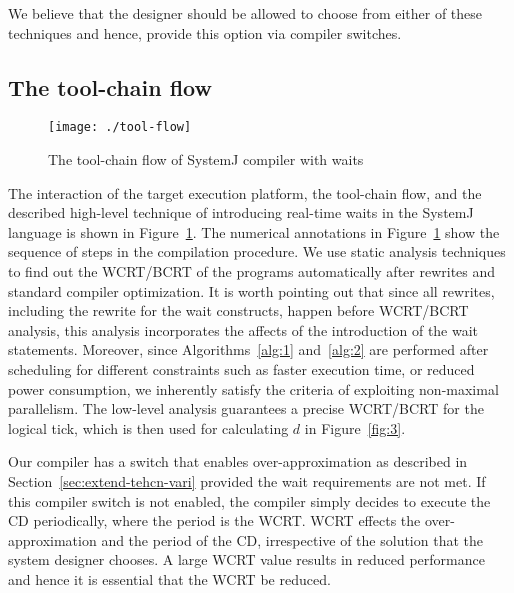 We believe that the designer should be allowed to choose from either of
these techniques and hence, provide this option via compiler switches.

\subsection{The tool-chain flow}
\label{sec:tool-chain-flow}

\begin{figure}[t!]
  \centering
  \texttt{[image: ./tool-flow]}
  \caption{The tool-chain flow of SystemJ compiler with waits}
  \label{fig:4}
\end{figure}

The interaction of the target execution platform, the tool-chain flow,
and the described high-level technique of introducing real-time waits in
the SystemJ language is shown in Figure~\ref{fig:4}. The numerical
annotations in Figure~\ref{fig:4} show the sequence of steps in the
compilation procedure. We use static analysis techniques \cite{zli14} to
find out the WCRT/BCRT of the programs automatically after rewrites and
standard compiler optimization.  It is worth pointing out that since all
rewrites, including the rewrite for the wait constructs, happen before
WCRT/BCRT analysis, this analysis incorporates the affects of the
introduction of the wait statements.  Moreover, since
Algorithms~\ref{alg:1} and~\ref{alg:2} are performed after scheduling
for different constraints such as faster execution time, or reduced
power consumption, we inherently satisfy the criteria of exploiting
non-maximal parallelism. The low-level analysis guarantees a precise
WCRT/BCRT for the logical tick, which is then used for calculating $d$
in Figure~\ref{fig:3}.

Our compiler has a switch that enables over-appro\-ximation as described
in Section~\ref{sec:extend-tehcn-vari} provided the wait requirements
are not met. If this compiler switch is not enabled, the compiler simply
decides to execute the CD periodically, where the period is the
WCRT. WCRT effects the over-approximation and the period of the CD,
irrespective of the solution that the system designer chooses. A large
WCRT value results in reduced performance and hence it is essential that
the WCRT be reduced.


